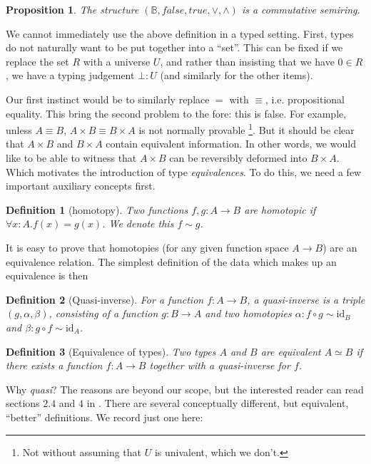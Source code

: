 \documentclass{article}
\newtheorem{defn}{Definition}[section]
\newtheorem{prop}{Proposition}[section]
\newcommand{\true}{\mathit{true}}
\newcommand{\false}{\mathit{false}}
\begin{document}
\begin{prop}
The structure $\left(\mathbb{B}, \false, \true, \lor, \land\right)$
is a commutative semiring.
\end{prop}

We cannot immediately use the above definition in a typed setting.
First, types do not naturally want to be put together into a ``set''.
This can be fixed if we replace the set $R$ with a universe $U$, and
rather than insisting that we have $0 \in R$, we have a typing
judgement $\bot : U$ (and similarly for the other items).

Our first instinct would be to similarly replace $=$ with
$\equiv$, i.e. propositional equality. This bring the second
problem to the fore: this is false. For example, unless $A \equiv B$,
$A \times B \equiv B \times A$ is not normally provable%
\footnote{Not without assuming that $U$ is univalent, which we
don't.}. But it should be clear that $A \times B$ and $B \times A$
contain equivalent information. In other words, we would like to
be able to witness that $A \times B$ can be reversibly deformed
into $B \times A$. Which motivates the introduction of 
type \emph{equivalences}. To do this, we need a few important
auxiliary concepts first.

\begin{defn}[homotopy]
\label{def:homotopy}
Two functions $f,g:A \rightarrow B$ are \emph{homotopic} if
$\forall x:A. f(x) = g(x)$. We denote this $f \sim g$.
\end{defn}

\noindent It is easy to prove that homotopies (for any given function
space $A \rightarrow B$) are an equivalence relation.  The simplest
definition of the data which makes up an equivalence is then

\begin{defn}[Quasi-inverse]
\label{def:quasi}
For a function $f : A \rightarrow B$, a \emph{quasi-inverse} is a
triple $(g, \alpha, \beta)$, consisting of a function
$g : B \rightarrow A$ and two homotopies
$\alpha : f \circ g \sim \mathrm{id}_B$ and
$\beta : g \circ f \sim \mathrm{id}_A$.
\end{defn}
 
\begin{defn}[Equivalence of types]
  Two types $A$ and $B$ are equivalent $A \simeq B$ if there exists a
  function $f : A \rightarrow B$ together with a quasi-inverse for $f$.
\end{defn}

\noindent Why \emph{quasi}? The reasons are beyond our scope, but
the interested reader can read sections $2.4$ and $4$ in \cite{hottbook}.
There are several conceptually different, but equivalent, 
``better'' definitions.  We record just one here:
\end{document}
